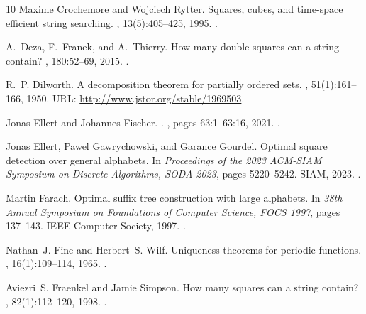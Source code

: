 \documentclass[11pt,letterpaper]{article}
\begin{document}
\begin{thebibliography}{10}
Maxime Crochemore and Wojciech Rytter.
\newblock Squares, cubes, and time-space efficient string searching.
, 13(5):405--425, 1995.
\newblock \href {https://doi.org/10.1007/BF01190846}
  {}.

A.~Deza, F.~Franek, and A.~Thierry.
\newblock How many double squares can a string contain?
, 180:52--69, 2015.
\newblock \href {https://doi.org/10.1016/J.DAM.2014.08.016}
  {}.

R.~P. Dilworth.
\newblock A decomposition theorem for partially ordered sets.
, 51(1):161--166, 1950.
\newblock URL: \url{http://www.jstor.org/stable/1969503}.

Jonas Ellert and Johannes Fischer.
.
, pages 63:1--63:16, 2021.
\newblock \href {https://doi.org/10.4230/LIPICS.ICALP.2021.63}
  {}.

Jonas Ellert, Pawel Gawrychowski, and Garance Gourdel.
\newblock Optimal square detection over general alphabets.
\newblock In {\em Proceedings of the 2023 {ACM-SIAM} Symposium on Discrete
  Algorithms, {SODA} 2023}, pages 5220--5242. {SIAM}, 2023.
\newblock \href {https://doi.org/10.1137/1.9781611977554.CH189}
  {}.

Martin Farach.
\newblock Optimal suffix tree construction with large alphabets.
\newblock In {\em 38th Annual Symposium on Foundations of Computer Science,
  {FOCS} 1997}, pages 137--143. {IEEE} Computer Society, 1997.
\newblock \href {https://doi.org/10.1109/SFCS.1997.646102}
  {}.

Nathan~J. Fine and Herbert~S. Wilf.
\newblock Uniqueness theorems for periodic functions.
,
  16(1):109--114, 1965.
\newblock \href {https://doi.org/10.2307/2034009} {}.

Aviezri~S. Fraenkel and Jamie Simpson.
\newblock How many squares can a string contain?
, 82(1):112--120,
  1998.
\newblock \href {https://doi.org/10.1006/jcta.1997.2843}
  {}.


\end{thebibliography}
\end{document}
